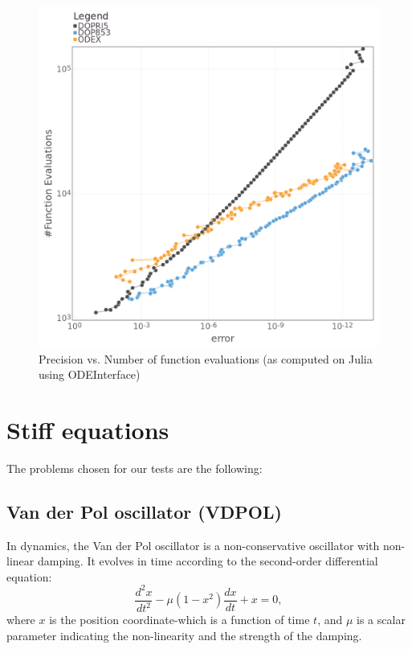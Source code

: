 \documentclass[notitlepage,12pt]{article}
\begin{document}
\begin{figure}[H]
\centering
\includegraphics[scale=0.4]{../ImagesAndPDFs/Plots/RopePrecisionTest.png}
\caption{Precision vs. Number of function evaluations (as computed on Julia using ODEInterface)}
\label{fig:ropeJulia}
\end{figure}

\newpage

\section{Stiff equations}
The problems chosen for our tests are the following:
\label{sec:stiff}

\subsection{Van der Pol oscillator (VDPOL)}
\label{sub:vdpol}
In dynamics, the Van der Pol oscillator is a non-conservative oscillator with non-linear damping. It evolves in time according to the second-order differential equation:
\begin{equation}
\label{vdpolEq}
\frac{d^2x}{dt^2} -\mu \left(1-x^2 \right)\frac{dx}{dt}+x=0,
\end{equation}
where $x$ is the position coordinate-which is a function of time $t$, and $\mu$ is a scalar parameter indicating the non-linearity and the strength of the damping.
\end{document}
